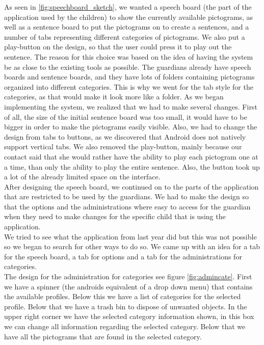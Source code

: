 As seen in \autoref{fig:speechboard_sketch}, we wanted a speech board (the part of the application used by the children) to show the currently available pictograms, as well as a sentence board to put the pictograms on to create a sentences, and a number of tabs representing different categories of pictograms. We also put a play-button on the design, so that the user could press it to play out the sentence.\newline
The reason for this choice was based on the idea of having the system be as close to the existing tools as possible. The guardians already have speech boards and sentence boards, and they have lots of folders containing pictograms organized into different categories. This is why we went for the tab style for the categories, as that would make it look more like a folder.\newline
As we began implementing the system, we realized that we had to make several changes. First of all, the size of the initial sentence board was too small, it would have to be bigger in order to make the pictograms easily visible. Also, we had to change the design from tabs to buttons, as we discovered that Android does not natively support vertical tabs. We also removed the play-button, mainly because our contact said that she would rather have the ability to play each pictogram one at a time, than only the ability to play the entire sentence. Also, the button took up a lot of the already limited space on the interface.\newline
\\
After designing the speech board, we continued on to the parts of the application that are restricted to be used by the guardians. We had to make the design so that the options and the administrations where easy to access for the guardian when they need to make changes for the specific child that is using the application. 
\\
We tried to see what the application from last year did but this was not possible so we began to search for other ways to do so. We came up with an idea for a tab for the speech board, a tab for options and a tab for the administrations for categories.\\

The design for the administration for categories see figure \ref{fig:admincate}. First we have a spinner (the androids equivalent of a drop down menu) that contains the available profiles. Below this we have a list of  categories for the selected profile. Below that we have a trash bin to dispose of unwanted objects. In the upper right corner we have the selected category information shown, in this box we can change all information regarding the selected category. Below that we have all the pictograms that are found in the selected category.       

